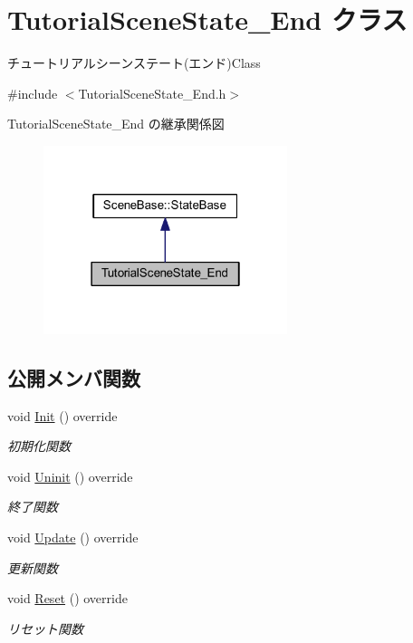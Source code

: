 \hypertarget{class_tutorial_scene_state___end}{}\section{Tutorial\+Scene\+State\+\_\+\+End クラス}
\label{class_tutorial_scene_state___end}


チュートリアルシーンステート(エンド)Class  




{\ttfamily \#include $<$Tutorial\+Scene\+State\+\_\+\+End.\+h$>$}



Tutorial\+Scene\+State\+\_\+\+End の継承関係図\nopagebreak
\begin{figure}[H]
\begin{center}
\leavevmode
\includegraphics[width=202pt]{class_tutorial_scene_state___end__inherit__graph}
\end{center}
\end{figure}
\subsection*{公開メンバ関数}
\begin{DoxyCompactItemize}
\item 
void \mbox{\hyperlink{class_tutorial_scene_state___end_a572e5687140ff5ac43789f90462c05a5}{Init}} () override
\begin{DoxyCompactList}\small\item\em 初期化関数 \end{DoxyCompactList}\item 
void \mbox{\hyperlink{class_tutorial_scene_state___end_aafc0d8d042de8c7f79d84fcdc35a807c}{Uninit}} () override
\begin{DoxyCompactList}\small\item\em 終了関数 \end{DoxyCompactList}\item 
void \mbox{\hyperlink{class_tutorial_scene_state___end_a7cdf03fa9a0e41ab86c2b41b8165ad09}{Update}} () override
\begin{DoxyCompactList}\small\item\em 更新関数 \end{DoxyCompactList}\item 
void \mbox{\hyperlink{class_tutorial_scene_state___end_ada1a87235a021b40f8eca96e31879227}{Reset}} () override
\begin{DoxyCompactList}\small\item\em リセット関数 \end{DoxyCompactList}\end{DoxyCompactItemize}
